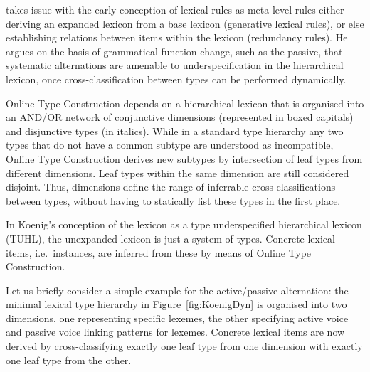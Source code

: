 \documentclass[output=paper
 	        ,biblatex
                ,babelshorthands
                ,newtxmath
                ,draftmode
                ,colorlinks, citecolor=brown
]{langscibook}
\begin{document}
\citet{Koenig99} takes issue with the early conception of lexical
rules as meta-level rules either deriving an expanded lexicon from a
base lexicon (generative lexical rules), or else establishing
relations between items within the lexicon (redundancy rules). He
argues on the basis of grammatical function change, such as the
 passive, that systematic alternations are amenable to
underspecification in the hierarchical lexicon,  once
cross-classification between types can be performed dynamically.

Online Type Construction depends on a hierarchical lexicon that is
organised into an AND/OR network of conjunctive dimensions
(represented in boxed capitals) and disjunctive types (in
italics). While in a standard type hierarchy any two types that do not
have a common subtype are understood as incompatible, Online Type
Construction derives new subtypes by intersection of leaf types from
different dimensions. Leaf types within the same dimension are still
considered disjoint. Thus, dimensions define the range of inferrable
cross-classifications between types, without having to statically list
these types in the first place.

In Koenig's conception of the lexicon as a type underspecified
hierarchical lexicon (TUHL), the unexpanded lexicon is just a system of
types. Concrete lexical items, i.e.\ instances, are inferred from these
by means of Online Type Construction. 

Let us briefly consider a simple example for the active/passive
alternation: the minimal lexical type hierarchy in
Figure~\ref{fig:KoenigDyn} is organised into two
dimensions, one representing specific lexemes, the other specifying
active voice and passive voice linking patterns for lexemes. Concrete
lexical items are now derived by cross-classifying exactly one leaf
type from one dimension with exactly one leaf type from the other.
\end{document}
